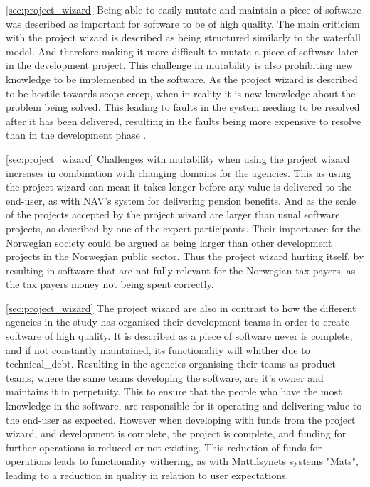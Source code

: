 \autoref{sec:project_wizard} Being able to easily mutate and maintain a piece of software was described as important for software to be of high quality. The main criticism with the project wizard is described as being structured similarly to the waterfall model. And therefore making it more difficult to mutate a piece of software later in the development project. This challenge in mutability is also prohibiting new knowledge to be implemented in the software. As the project wizard is described to be hostile towards scope creep, when in reality it is new knowledge about the problem being solved. This leading to faults in the system needing to be resolved after it has been delivered, resulting in the faults being more expensive to resolve than in the development phase \cite{sh_2018}\cite{csw_2011}.

 \autoref{sec:project_wizard} Challenges with mutability when using the project wizard increases in combination with changing domains for the agencies. This as using the project wizard can mean it takes longer before any value is delivered to the end-user, as with NAV's system for delivering pension benefits. And as the scale of the projects accepted by the project wizard are larger than usual software projects, as described by one of the expert participants. Their importance for the Norwegian society could be argued as being larger than other development projects in the Norwegian public sector. Thus the project wizard hurting itself, by resulting in software that are not fully relevant for the Norwegian tax payers, as the tax payers money not being spent correctly.

\autoref{sec:project_wizard} The project wizard are also in contrast to how the different agencies in the study has organised their development teams in order to create software of high quality. It is described as a piece of software never is complete, and if not constantly maintained, its functionality will whither due to \gls{technical_debt}. Resulting in the agencies organising their teams as product teams, where the same teams developing the software, are it's owner and maintains it in perpetuity. This to ensure that the people who have the most knowledge in the software, are responsible for it operating and delivering value to the end-user as expected. However when developing with funds from the project wizard, and development is complete, the project is complete, and funding for further operations is reduced or not existing. This reduction of funds for operations leads to functionality withering, as with Mattilsynets systems "Mats", leading to a reduction in quality in relation to user expectations.

